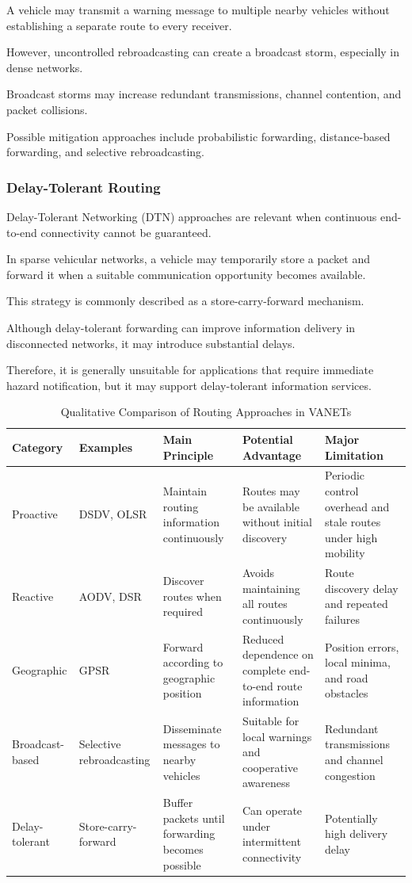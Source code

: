A vehicle may transmit
a warning message to
multiple nearby vehicles
without establishing
a separate route to
every receiver.

However, uncontrolled
rebroadcasting can
create a broadcast
storm, especially
in dense networks.

Broadcast storms
may increase redundant
transmissions, channel
contention, and
packet collisions.

Possible mitigation
approaches include
probabilistic forwarding,
distance-based forwarding,
and selective rebroadcasting.

\subsubsection{Delay-Tolerant Routing}

Delay-Tolerant Networking
(DTN) approaches are
relevant when continuous
end-to-end connectivity
cannot be guaranteed.

In sparse vehicular
networks, a vehicle
may temporarily store
a packet and forward
it when a suitable
communication opportunity
becomes available.

This strategy is commonly
described as a
store-carry-forward
mechanism.

Although delay-tolerant
forwarding can improve
information delivery
in disconnected networks,
it may introduce
substantial delays.

Therefore, it is
generally unsuitable
for applications that
require immediate
hazard notification,
but it may support
delay-tolerant
information services.

\begin{table}[t]
\centering
\caption{Qualitative Comparison of Routing Approaches in VANETs}
\label{tab:routing_comparison}
\footnotesize
\begin{tabular}{|p{2.1cm}|p{2.0cm}|p{3.2cm}|p{3.3cm}|p{4.0cm}|}
\hline
\textbf{Category} &
\textbf{Examples} &
\textbf{Main Principle} &
\textbf{Potential Advantage} &
\textbf{Major Limitation} \\
\hline
Proactive &
DSDV, OLSR &
Maintain routing information continuously &
Routes may be available without initial discovery &
Periodic control overhead and stale routes under high mobility \\
\hline
Reactive &
AODV, DSR &
Discover routes when required &
Avoids maintaining all routes continuously &
Route discovery delay and repeated failures \\
\hline
Geographic &
GPSR &
Forward according to geographic position &
Reduced dependence on complete end-to-end route information &
Position errors, local minima, and road obstacles \\
\hline
Broadcast-based &
Selective rebroadcasting &
Disseminate messages to nearby vehicles &
Suitable for local warnings and cooperative awareness &
Redundant transmissions and channel congestion \\
\hline
Delay-tolerant &
Store-carry-forward &
Buffer packets until forwarding becomes possible &
Can operate under intermittent connectivity &
Potentially high delivery delay \\
\hline
\end{tabular}
\end{table}

